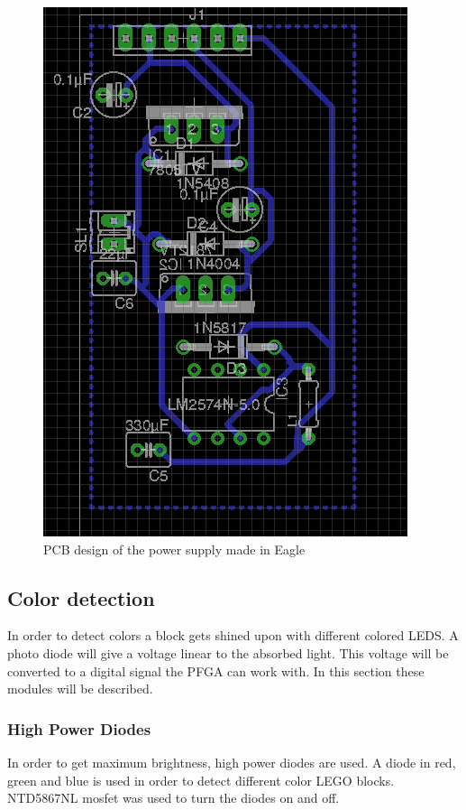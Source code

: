 \begin{figure}[ht]
\centering
\includegraphics[angle=90,scale=0.5]{img/pcb_power.png}
\caption{PCB design of the power supply made in Eagle} 
\label{fig::pcb_power}
\end{figure}

\subsection{Color detection}
In order to detect colors a block gets shined upon with different colored LEDS.
A photo diode will give a voltage linear to the absorbed light.
This voltage will be converted to a digital signal the PFGA can work with.
In this section these modules will be described.
\subsubsection{High Power Diodes}
In order to get maximum brightness, high power diodes are used.
A diode in red, green and blue is used in order to detect different color LEGO blocks.
NTD5867NL mosfet was used to turn the diodes on and off.

